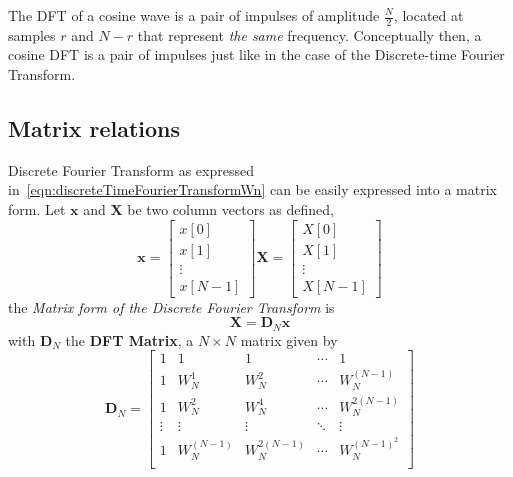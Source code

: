 \documentclass[\documentfontsize, twocolumn]{\classname}
\begin{document}
The DFT of a cosine wave is a pair of impulses of amplitude $\frac N 2$, located at samples $r$ and $N-r$ that represent \emph{the same} frequency. Conceptually then, a cosine DFT is a pair of impulses just like in the case of the Discrete-time Fourier Transform.

\subsection{Matrix relations}

Discrete Fourier Transform as expressed in~\ref{eqn:discreteTimeFourierTransformWn} can be easily expressed into a matrix form. Let $\bm x$ and $\bm X$ be two column vectors as defined,
\[
    \bm{x} = \begin{bmatrix} x[0] \\ x[1] \\ \vdots \\ x[N-1] \end{bmatrix}
    \bm{X} = \begin{bmatrix} X[0] \\ X[1] \\ \vdots \\ X[N-1] \end{bmatrix}
\]
the \emph{Matrix form of the Discrete Fourier Transform} is
\begin{equation}\label{eqn:dftMatrixForm}
    \bm{X} = \bm{D}_N\bm{x}
\end{equation}
with $\bm D_N$ the \textbf{DFT Matrix}, a $N \times N$ matrix given by
\begin{equation}\label{eqn:dftMatrixDn}
    \bm D_N = \begin{bmatrix}
        1 & 1 & 1 & \cdots & 1 \\
        1 & W_N^1 & W_N^2 & \cdots & W_N^{(N-1)} \\
        1 & W_N^2 & W_N^4 & \cdots & W_N^{2(N-1)} \\
        \vdots & \vdots & \vdots & \ddots & \vdots \\
        1 & W_N^{(N-1)} & W_N^{2(N-1)} & \cdots & W_N^{(N-1)^2} \\
    \end{bmatrix}
\end{equation}
\end{document}
